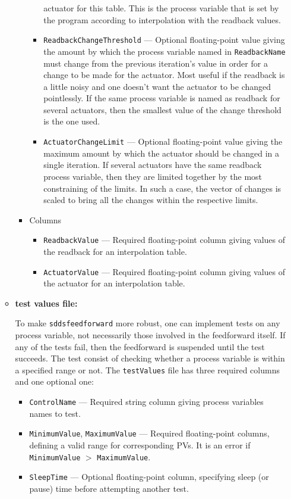 \begin{itemize}
\begin{itemize}
\begin{itemize}
\begin{itemize}
        actuator for this table.  This is the process variable that is set by
        the program according to interpolation with the readback values.
\item {\tt ReadbackChangeThreshold} --- Optional floating-point value giving
        the amount by which the process variable named in {\tt ReadbackName}
        must change from the previous iteration's value in order for a
        change to be made for the actuator.  Most useful if the readback is
        a little noisy and one doesn't want the actuator to be changed
        pointlessly.  If the same process variable is named as readback for
        several actuators, then the smallest value of the change threshold
        is the one used.
\item {\tt ActuatorChangeLimit} --- Optional floating-point value giving 
        the maximum amount by which the actuator should be changed in a
        single iteration.  If several actuators have the same
        readback process variable, then they are limited together by the
        most constraining of the limits.  In such a case, the vector of
        changes is scaled to bring all the changes within the respective
        limits.
\end{itemize}
\item Columns
\begin{itemize}
\item {\tt ReadbackValue} --- Required floating-point column giving values
        of the readback for an interpolation table.
\item {\tt ActuatorValue} --- Required floating-point column giving values
        of the actuator for an interpolation table.
\end{itemize}
\end{itemize}

\item {\bf test values file:} \par
To make \verb+sddsfeedforward+ more robust, one can implement tests on any process variable,
not necessarily those involved in the feedforward itself. If any of the tests fail, then the 
feedforward is suspended until the test succeeds. The test consist of checking whether a process 
variable is within a specified range or not. The \verb+testValues+ file has three required columns and
one optional one:
\begin{itemize}
        \item {\tt ControlName} --- Required string column giving process variables names to test.
        \item {\tt MinimumValue}, {\tt MaximumValue} --- Required floating-point columns, defining
                a valid range for corresponding PVs.  It is an error if
                {\tt MinimumValue} $>$ {\tt MaximumValue}.
        \item {\tt SleepTime} --- Optional floating-point column, specifying sleep (or pause) time before
                attempting another test.
\end{itemize}
\end{itemize}


\end{itemize}
